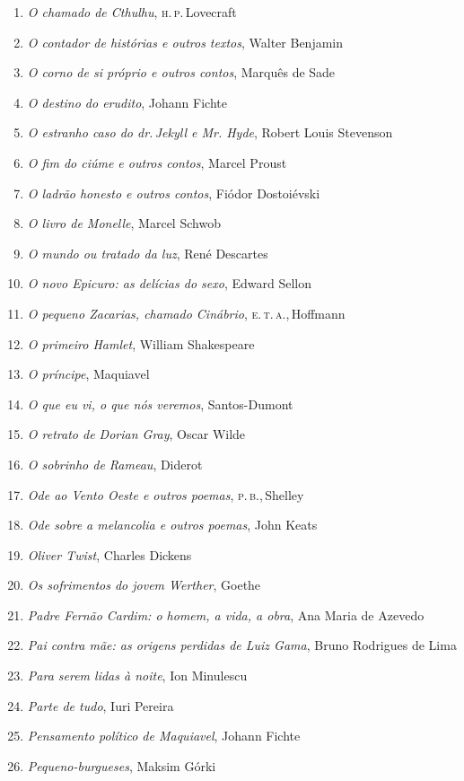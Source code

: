 \begin{enumerate}
\item \textit{O chamado de Cthulhu}, \textsc{h.\,p.}\,Lovecraft
\item \textit{O contador de histórias e outros textos}, Walter Benjamin
\item \textit{O corno de si próprio e outros contos}, Marquês de Sade
\item \textit{O destino do erudito}, Johann Fichte
\item \textit{O estranho caso do dr.\,Jekyll e Mr. Hyde}, Robert Louis Stevenson
\item \textit{O fim do ciúme e outros contos}, Marcel Proust
\item \textit{O ladrão honesto e outros contos}, Fiódor Dostoiévski
\item \textit{O livro de Monelle}, Marcel Schwob
\item \textit{O mundo ou tratado da luz}, René Descartes
\item \textit{O novo Epicuro: as delícias do sexo}, Edward Sellon
\item \textit{O pequeno Zacarias, chamado Cinábrio}, \textsc{e.\,t.\,a.},\,Hoffmann
\item \textit{O primeiro Hamlet}, William Shakespeare
\item \textit{O príncipe}, Maquiavel
\item \textit{O que eu vi, o que nós veremos}, Santos-Dumont
\item \textit{O retrato de Dorian Gray}, Oscar Wilde
\item \textit{O sobrinho de Rameau}, Diderot
\item \textit{Ode ao Vento Oeste e outros poemas}, \textsc{p.\,b.},\,Shelley
\item \textit{Ode sobre a melancolia e outros poemas}, John Keats
\item \textit{Oliver Twist}, Charles Dickens
\item \textit{Os sofrimentos do jovem Werther}, Goethe
\item \textit{Padre Fernão Cardim: o homem, a vida, a obra}, Ana Maria de Azevedo
\item \textit{Pai contra mãe: as origens perdidas de Luiz Gama}, Bruno Rodrigues de Lima
\item \textit{Para serem lidas à noite}, Ion Minulescu
\item \textit{Parte de tudo}, Iuri Pereira
\item \textit{Pensamento político de Maquiavel}, Johann Fichte
\item \textit{Pequeno-burgueses}, Maksim Górki

\end{enumerate}
